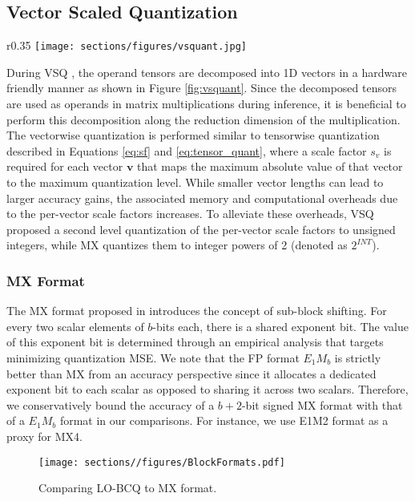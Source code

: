 \subsection{Vector Scaled Quantization}
\begin{wrapfigure}{r}{0.35\linewidth}
  \centering
  \texttt{[image: sections/figures/vsquant.jpg]}
  \caption{\small Vectorwise decomposition for per-vector scaled quantization (VSQ \citep{dai2021vsq}).}
  \label{fig:vsquant}
\end{wrapfigure}
During VSQ \citep{dai2021vsq}, the operand tensors are decomposed into 1D vectors in a hardware friendly manner as shown in Figure \ref{fig:vsquant}. Since the decomposed tensors are used as operands in matrix multiplications during inference, it is beneficial to perform this decomposition along the reduction dimension of the multiplication. The vectorwise quantization is performed similar to tensorwise quantization described in Equations \ref{eq:sf} and \ref{eq:tensor_quant}, where a scale factor $s_v$ is required for each vector $\bm{v}$ that maps the maximum absolute value of that vector to the maximum quantization level. While smaller vector lengths can lead to larger accuracy gains, the associated memory and computational overheads due to the per-vector scale factors increases. To alleviate these overheads, VSQ \citep{dai2021vsq} proposed a second level quantization of the per-vector scale factors to unsigned integers, while MX \citep{rouhani2023shared} quantizes them to integer powers of 2 (denoted as $2^{INT}$).

\subsubsection{MX Format}
The MX format proposed in \citep{rouhani2023microscaling} introduces the concept of sub-block shifting. For every two scalar elements of $b$-bits each, there is a shared exponent bit. The value of this exponent bit is determined through an empirical analysis that targets minimizing quantization MSE. We note that the FP format $E_{1}M_{b}$ is strictly better than MX from an accuracy perspective since it allocates a dedicated exponent bit to each scalar as opposed to sharing it across two scalars. Therefore, we conservatively bound the accuracy of a $b+2$-bit signed MX format with that of a $E_{1}M_{b}$ format in our comparisons. For instance, we use E1M2 format as a proxy for MX4.

\begin{figure}
    \centering
    \texttt{[image: sections//figures/BlockFormats.pdf]}
    \caption{\small Comparing LO-BCQ to MX format.}
    \label{fig:block_formats}
\end{figure}

